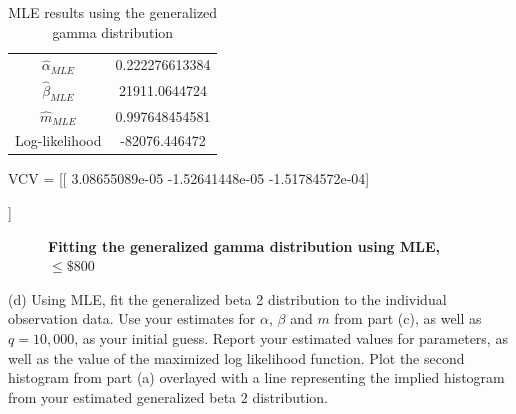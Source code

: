 \documentclass[letterpaper,12pt]{article}
\theoremstyle{definition}
\begin{document}
\begin{table}[h!]
 \centering
 \caption{MLE results using the generalized gamma distribution}
 \begin{tabular}{|c | c |} 
  \hline
  $\hat{\alpha}_{MLE}$ & 0.222276613384 \\ 
  $\hat{\beta}_{MLE}$ & 21911.0644724 \\
  $\hat{m}_{MLE}$ & 0.997648454581\\
  Log-likelihood & -82076.446472\\
  \hline
  \end{tabular}
\end{table}
\par
VCV =  [[  3.08655089e-05  -1.52641448e-05  -1.51784572e-04]\par
 [ -1.52641448e-05   1.00903661e+00   5.29737394e-03]\par
 [ -1.51784572e-04   5.29737394e-03   4.58901429e-02]]
\par

\begin{figure}[H]\centering\captionsetup{width=4.0in}
  \caption{\textbf{Fitting the generalized gamma distribution using MLE, $\leq \$800$}}
\end{figure}
\par\bigskip

\noindent(d) Using MLE, fit the generalized beta 2 distribution to the individual observation data. Use your estimates for $\alpha$, $\beta$ and $m$ from part (c), as well as $q = 10,000$, as your initial guess. Report your estimated values for parameters, as well as the value of the maximized log likelihood function. Plot the second histogram from part (a) overlayed with a line representing
the implied histogram from your estimated generalized beta 2 distribution.
\par\bigskip
\end{document}
